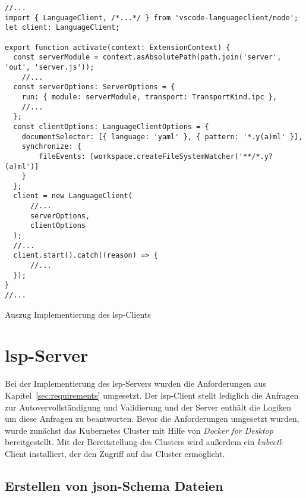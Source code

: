 \begin{listing}[htp]
      \begin{verbatim}
//...
import { LanguageClient, /*...*/ } from 'vscode-languageclient/node';
let client: LanguageClient;
      
export function activate(context: ExtensionContext) {
  const serverModule = context.asAbsolutePath(path.join('server', 'out', 'server.js'));
    //...
  const serverOptions: ServerOptions = {
    run: { module: serverModule, transport: TransportKind.ipc },
    //...
  };
  const clientOptions: LanguageClientOptions = {
    documentSelector: [{ language: 'yaml' }, { pattern: '*.y(a)ml' }],
    synchronize: {
        fileEvents: [workspace.createFileSystemWatcher('**/*.y?(a)ml')]
    }
  };
  client = new LanguageClient(
      //...
      serverOptions,
      clientOptions
  );
  //...
  client.start().catch((reason) => {
      //...
  });
}
//...
      \end{verbatim}
      \caption{Auszug Implementierung des \acs{lsp}-Clients}
      \label{lst:client-code}
\end{listing}

\section{\acs{lsp}-Server}

Bei der Implementierung des \ac{lsp}-Servers wurden die Anforderungen aus Kapitel~\ref{sec:requirements} umgesetzt.
Der \acs{lsp}-Client stellt lediglich die Anfragen zur Autovervollständigung und Validierung und der Server enthält die
Logiken um diese Anfragen zu beantworten.
Bevor die Anforderungen umgesetzt wurden, wurde zunächst das Kubernetes Cluster
mit Hilfe von \textit{Docker for Desktop} bereitgestellt. Mit der Bereitstellung des Clusters wird außerdem
ein \textit{kubectl}-Client installiert, der den Zugriff auf das Cluster ermöglicht.

\subsection{Erstellen von \acs{json}-Schema Dateien}

